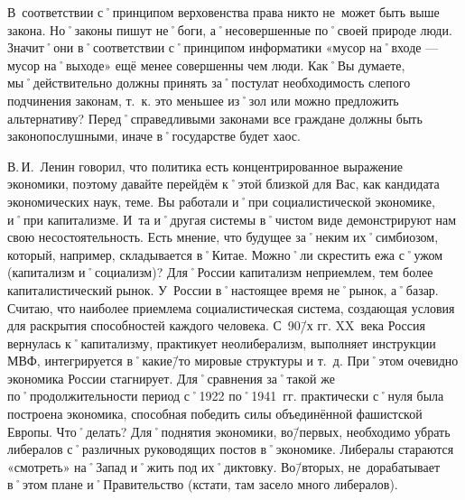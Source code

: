 \begin{drama}
	\pagebreak
	
	\maxspeaks В~соответствии с˚принципом верховенства права никто не~может быть выше закона. Но˚законы пишут не˚боги, а˚несовершенные по˚своей природе люди. Значит˚они в˚соответствии с˚принципом информатики  «мусор на˚входе — мусор на˚выходе» ещё менее совершенны чем люди. Как˚Вы думаете, мы˚действительно должны принять за˚постулат необходимость слепого подчинения законам, т.~к. это меньшее из˚зол или можно предложить альтернативу?
	\michaelspeaks Перед˚справедливыми законами все граждане должны быть законопослушными, иначе в˚государстве будет хаос.

	\maxspeaks В.\,И.~Ленин говорил, что политика есть концентрированное выражение экономики, поэтому давайте перейдём к˚этой близкой для Вас, как кандидата экономических наук, теме. Вы работали и˚при социалистической экономике, и˚при капитализме. И~та и˚другая системы в˚чистом виде демонстрируют нам свою несостоятельность. Есть мнение, что будущее за˚неким их˚симбиозом, который, например, складывается в˚Китае. Можно˚ли скрестить ежа с˚ужом (капитализм и˚социализм)?
	\michaelspeaks Для˚России капитализм неприемлем, тем более капиталистический рынок. У~России в˚настоящее время не˚рынок, а˚базар. Считаю, что наиболее приемлема социалистическая система, создающая условия для раскрытия способностей каждого человека.
	\maxspeaks С~90\=/х гг. XX~века Россия вернулась к˚капитализму, практикует неолиберализм, выполняет инструкции МВФ, интегрируется в˚какие\=/то мировые структуры и т.~д. При˚этом очевидно экономика России стагнирует. Для˚сравнения за˚такой же по˚продолжительности период с˚1922 по˚1941~гг. практически с˚нуля была построена экономика, способная победить силы объединённой фашистской Европы. Что˚делать? 
	\michaelspeaks Для˚поднятия экономики, во\=/первых, необходимо убрать либералов с˚различных руководящих постов в˚экономике. Либералы стараются «смотреть» на˚Запад и˚жить под их˚диктовку. Во\=/вторых, не~дорабатывает в˚этом плане и˚Правительство (кстати, там засело много либералов).


\end{drama}
